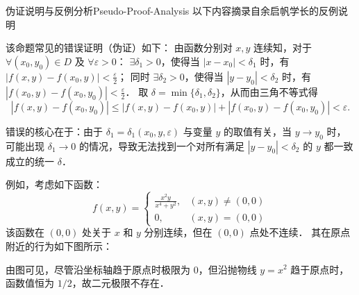 \begin{note}{伪证说明与反例分析}{Pseudo-Proof-Analysis}
    以下内容摘录自余启帆学长的反例说明 \cite{Yu2021MathAnalysis}

    该命题常见的错误证明（伪证）如下：
    由函数分别对 $x, y$ 连续知，对于 $\forall(x_0, y_0) \in D$ 及 $\forall \varepsilon > 0$：
    $\exists \delta_1 > 0$，使得当 $|x - x_0| < \delta_1$ 时，有 $|f(x, y) - f(x_0, y)| < \frac{\varepsilon}{2}$；
    同时 $\exists \delta_2 > 0$，使得当 $|y - y_0| < \delta_2$ 时，有 $|f(x_0, y) - f(x_0, y_0)| < \frac{\varepsilon}{2}$．
    取 $\delta = \min\{\delta_1, \delta_2\}$，从而由三角不等式得
    \begin{equation}
        |f(x, y) - f(x_0, y_0)| \le |f(x, y) - f(x_0, y)| + |f(x_0, y) - f(x_0, y_0)| < \varepsilon.
    \end{equation}

    错误的核心在于：由于 $\delta_1 = \delta_1(x_0, y, \varepsilon)$ 与变量 $y$ 的取值有关，当 $y \to y_0$ 时，可能出现 $\delta_1 \to 0$ 的情况，导致无法找到一个对所有满足 $|y-y_0|<\delta_2$ 的 $y$ 都一致成立的统一 $\delta$．

    例如，考虑如下函数：
    \begin{equation}
        \boxed{f(x, y) = \begin{cases} \frac{x^2 y}{x^4 + y^2}, & (x, y) \neq (0, 0) \\ 0, & (x, y) = (0, 0) \end{cases}}
    \end{equation}
    该函数在 $(0,0)$ 处关于 $x$ 和 $y$ 分别连续，但在 $(0,0)$ 点处不连续．
    其在原点附近的行为如下图所示：

    \begin{center}
    \end{center}

    由图可见，尽管沿坐标轴趋于原点时极限为 $0$，但沿抛物线 $y = x^2$ 趋于原点时，函数值恒为 $1/2$，故二元极限不存在．
\end{note}



